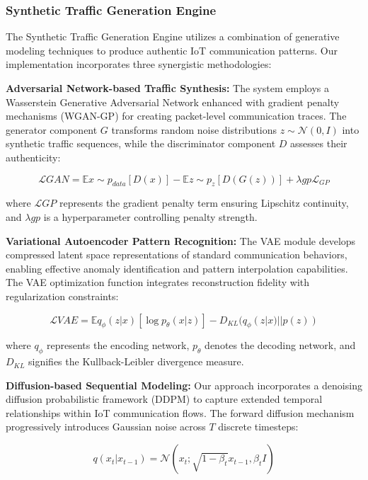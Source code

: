 \documentclass[conference]{IEEEtran}
\begin{document}
\subsubsection{Synthetic Traffic Generation Engine}

The Synthetic Traffic Generation Engine utilizes a combination of generative modeling techniques to produce authentic IoT communication patterns. Our implementation incorporates three synergistic methodologies:

\textbf{Adversarial Network-based Traffic Synthesis:} The system employs a Wasserstein Generative Adversarial Network enhanced with gradient penalty mechanisms (WGAN-GP) for creating packet-level communication traces. The generator component $G$ transforms random noise distributions $z \sim \mathcal{N}(0,I)$ into synthetic traffic sequences, while the discriminator component $D$ assesses their authenticity:

\begin{equation}
\mathcal{L}{GAN} = \mathbb{E}{x \sim p_{data}}[D(x)] - \mathbb{E}{z \sim p_z}[D(G(z))] + \lambda{gp}\mathcal{L}_{GP}
\end{equation}

where $\mathcal{L}{GP}$ represents the gradient penalty term ensuring Lipschitz continuity, and $\lambda{gp}$ is a hyperparameter controlling penalty strength.

\textbf{Variational Autoencoder Pattern Recognition:} The VAE module develops compressed latent space representations of standard communication behaviors, enabling effective anomaly identification and pattern interpolation capabilities. The VAE optimization function integrates reconstruction fidelity with regularization constraints:

\begin{equation}
\mathcal{L}{VAE} = \mathbb{E}{q_\phi(z|x)}[\log p_\theta(x|z)] - D_{KL}(q_\phi(z|x) || p(z))
\end{equation}

where $q_\phi$ represents the encoding network, $p_\theta$ denotes the decoding network, and $D_{KL}$ signifies the Kullback-Leibler divergence measure.

\textbf{Diffusion-based Sequential Modeling:} Our approach incorporates a denoising diffusion probabilistic framework (DDPM) to capture extended temporal relationships within IoT communication flows. The forward diffusion mechanism progressively introduces Gaussian noise across $T$ discrete timesteps:

\begin{equation}
q(x_t|x_{t-1}) = \mathcal{N}(x_t; \sqrt{1-\beta_t}x_{t-1}, \beta_t I)
\end{equation}
\end{document}

